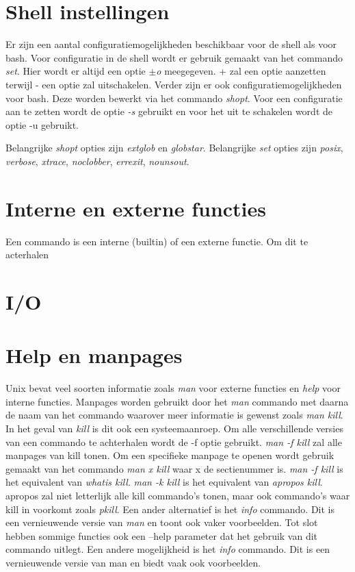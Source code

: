 \documentclass{report}
\begin{document}
\section{Shell instellingen}
Er zijn een aantal configuratiemogelijkheden beschikbaar voor de shell als voor bash. Voor configuratie in de shell wordt er gebruik gemaakt van het commando \textit{set}. Hier wordt er altijd een optie \textit{$\pm$o} meegegeven. + zal een optie aanzetten terwijl - een optie zal uitschakelen. Verder zijn er ook configuratiemogelijkheden voor bash. Deze worden bewerkt via het commando \textit{shopt}. Voor een configuratie aan te zetten wordt de optie \textit{-s} gebruikt en voor het uit te schakelen wordt de optie -u gebruikt.

Belangrijke \textit{shopt} opties zijn \textit{extglob} en \textit{globstar}. Belangrijke \textit{set} opties zijn \textit{posix}, \textit{verbose}, \textit{xtrace}, \textit{noclobber}, \textit{errexit}, \textit{nounsout}.


\section{Interne en externe functies}
Een commando is een interne (builtin) of een externe functie. Om dit te acterhalen

\section{I/O}

\section{Help en manpages}
Unix bevat veel soorten informatie zoals \textit{man} voor externe functies en \textit{help} voor interne functies. Manpages worden gebruikt door het \textit{man} commando met daarna de naam van het commando waarover meer informatie is gewenst zoals \textit{man kill}. In het geval van \textit{kill} is dit ook een systeemaanroep. Om alle verschillende versies van een commando te achterhalen wordt de -f optie gebruikt. \textit{man -f kill} zal alle manpages van kill tonen. Om een specifieke manpage te openen wordt gebruik gemaakt van het commando \textit{man x kill} waar x de sectienummer is. \textit{man -f kill} is het equivalent van \textit{whatis kill}. \textit{man -k kill} is het equivalent van \textit{apropos kill}. apropos zal niet letterlijk alle kill commando's tonen, maar ook commando's waar kill in voorkomt zoals \textit{pkill}. Een ander alternatief is het \textit{info} commando. Dit is een vernieuwende versie van \textit{man} en toont ook vaker voorbeelden. Tot slot hebben sommige functies ook een --help parameter dat het gebruik van dit commando uitlegt. Een andere mogelijkheid is het \textit{info} commando. Dit is een vernieuwende versie van man en biedt vaak ook voorbeelden.
\end{document}
